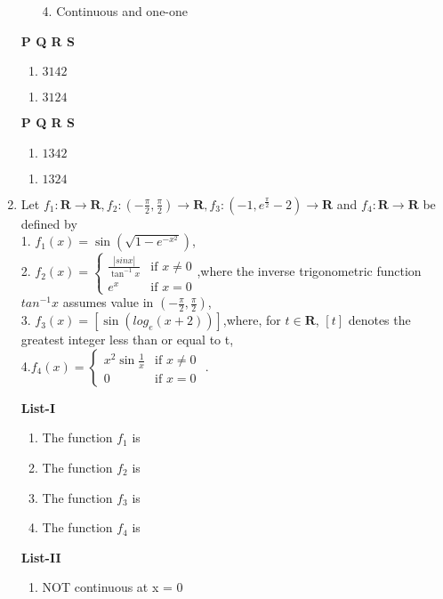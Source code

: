 \documentclass[journal,12pt,twocolumn]{IEEEtran}
\theoremstyle{remark}
\begin{document}
\begin{enumerate}
\begin{multicols}{2}
\begin{enumerate}
					\item[4.]  Continuous and one-one
				\end{enumerate}
		\end{multicols}
		\begin{multicols}{2}
			\textbf{   P Q R S}
			\begin{enumerate}[label=(\alph*)]
				\item $ 3 1 4 2$
			\end{enumerate}
			\begin{enumerate}[label=(\alph*), start=3]
				\item$ 3 1 2 4$
			\end{enumerate}
			\columnbreak
			\textbf{   P Q R S }
			\begin{enumerate}[label=(\alph*), start=2]
				\item $1 3 4 2$ 
			\end{enumerate}
			\begin{enumerate}[label=(\alph*)]
				\item $1 3 2 4$
			\end{enumerate}
		\end{multicols}
            \item Let $f_1: \textbf{R}\rightarrow \textbf{R},f_2:(-\frac{\pi}{2},\frac{\pi}{2})\rightarrow \textbf{R}, f_3:(-1,e^\frac{\pi}{2}-2)\rightarrow \textbf{R}$ and $f_4: \textbf{R}\rightarrow \textbf{R}$ be defined by \\
            1. $f_1(x)=\sin({\sqrt{1-e^{-x^2}}})$, \\
            2. $f_2(x) =
             \begin{cases}
                 \frac{|sin x|}{\tan^{-1}x} & \text{if } x \neq 0 \\
                 e^x & \text{if } x = 0 
                 \end{cases}$,where the inverse trigonometric function $tan^{-1}x $ assumes value in $(-\frac{\pi}{2},\frac{\pi}{2})$,\\
            3. $f_3(x)=[\sin({log_e(x+2)})]$,where, for $t\in \textbf{R}$, $[t]$ denotes the greatest integer less than or equal to t, \\
            4.$f_4(x) =
        \begin{cases}
                 x^2\sin{\frac{1}{x}} & \text{if } x \neq 0 \\
                 0 & \text{if } x = 0 
                 \end{cases}$ .
                 \begin{multicols}{2} 
				\textbf{List-I} 
				\begin{enumerate}[label=\Alph*., start=16]
					\item The function $f_1$ is
					\item The function $f_2$ is 
					\item The function $f_3$ is 
					\item The function $f_4$ is
				\end{enumerate}
				\columnbreak
				\textbf{List-II}
				\begin{enumerate}
					\item  NOT continuous at x = 0 


\end{enumerate}
\end{multicols}
\end{enumerate}
\end{document}
